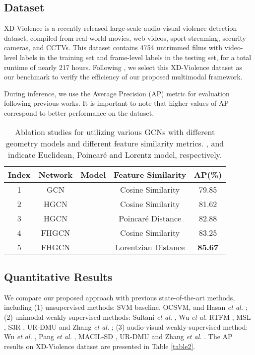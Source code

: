 \documentclass[sigconf]{acmart}
\newcommand{\etal}{{\emph{et al. }}}
\newcommand{\poincare}{Poincar\'e }
\begin{document}
\subsection{Dataset}
XD-Violence\cite{c:2} is a recently released large-scale audio-visual violence detection dataset, compiled from real-world movies, web videos, sport streaming, security cameras, and CCTVs. This dataset contains 4754 untrimmed films with video-level labels in the training set and frame-level labels in the testing set, for a total runtime of nearly 217 hours. Following \cite{c:2, pang2021violence, c:4}, we select this XD-Violence dataset as our benchmark to verify the efficiency of our proposed multimodal framework.

During inference, we use the Average Precision (AP) metric for evaluation following previous works\cite{c:1,c:2, pang2021violence,c:4}. It is important to note that higher values of AP correspond to better performance on the dataset.



\begin{table}[t]
  \caption{Ablation studies for utilizing various GCNs with different geometry models and different feature similarity metrics. ,  and  indicate Euclidean, \poincare and Lorentz model, respectively.}
  \label{table3}
  \begin{tabular}{ccccc}
    \toprule
    Index  & Network & Model & Feature Similarity & AP(\%)\\
    \midrule
    1 &  GCN &  & Cosine Similarity & 79.85\\
    2 & HGCN &  & Cosine Similarity & 81.62\\
    3 & HGCN &  & \poincare Distance & 82.88 \\ \hline
    4  &  FHGCN &  & Cosine Similarity & 83.25\\
    5 & FHGCN &  & Lorentzian Distance & \textbf{85.67}\\
  \bottomrule
\end{tabular}
\end{table}



\subsection{Quantitative Results}
We compare our proposed approach with previous state-of-the-art methods, including (1) unsupervised methods: SVM baseline, OCSVM\cite{c:5}, and Hasan \etal\cite{c:6}; (2) unimodal weakly-supervised methods: Sultani \etal \cite{c:7}, Wu \etal \cite{c:8} RTFM \cite{c:1},  MSL \cite{c:9}, S3R \cite{c:11}, UR-DMU \cite{c:10} and Zhang \etal\cite{zhang2022exploiting}; (3) audio-visual weakly-supervised method: Wu \etal \cite{c:2},  Pang \etal \cite{pang2021violence}, MACIL-SD \cite{c:4}, UR-DMU \cite{c:10} and Zhang \etal\cite{zhang2022exploiting}. The AP results on XD-Violence dataset are presented in Table \ref{table2}. 
\end{document}
